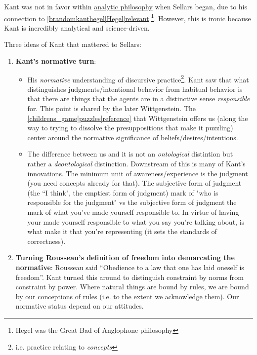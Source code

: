 Kant was not in favor within \href{https://en.wikipedia.org/wiki/Analytic_philosophy}{analytic philosophy} when Sellars began, due to his connection to \ref{brandomkanthegel|Hegel|relevant}\footnote{Hegel was the Great Bad of Anglophone philosophy}. However, this is ironic because Kant is incredibly analytical and science-driven.

Three ideas of Kant that mattered to Sellars:
\begin{enumerate}
\item \textbf{Kant's normative turn}:
\begin{itemize}
\item His \emph{normative} understanding of discursive practice\footnote{i.e. practice relating to \emph{concepts}}. Kant saw that what distinguishes judgments/intentional behavior from habitual behavior is that there are things that the agents are in a distinctive sense \emph{responsible} for. This point is shared by the later Wittgenstein. The \ref{childrens_game|puzzles|reference} that Wittgenstein offers us (along the way to trying to dissolve the presuppositions that make it puzzling) center around the normative significance of beliefs/desires/intentions.

\item The difference between us and it is not an \emph{ontological} distintion but rather a \emph{deontological} distinction. Downstream of this is many of Kant's innovations. The minimum unit of awareness/experience is the judgment (you need concepts already for that). The subjective form of judgment (the ``I think", the emptiest form of judgment) mark of "who is responsible for the judgment" vs the subjective form of judgment the mark of what you've made yourself responsible to. In virtue of having your made yourself responsible to what you say you're talking about, is what make it that you're representing (it sets the standards of correctness).
\end{itemize}

\item \textbf{Turning Rousseau's definition of freedom into demarcating the normative}: Rousseau said ``Obedience to a law that one has laid oneself is freedom''. Kant turned this around to distinguish constraint by norms from constraint by power. Where natural things are bound by rules, we are bound by our conceptions of rules (i.e. to the extent we acknowledge them). Our normative status depend on our attitudes.


\end{enumerate}
